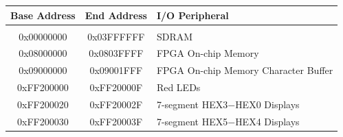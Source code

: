 \documentclass[11pt, twoside, pdftex]{article}
\begin{document}
\begin{table}[h]
    \begin{center}
    \begin{tabular}{c|c|l}
            \textbf{Base Address}
            & \textbf{End Address}
            & \textbf{I/O Peripheral}
				\\\hline\vspace{-3mm}\\
            0x00000000
            & 0x03FFFFFF
            & SDRAM
        \\
            0x08000000
            & 0x0803FFFF
            & FPGA On-chip Memory
        \\
            0x09000000
            & 0x09001FFF
            & FPGA On-chip Memory Character Buffer
        \\
            0xFF200000
            & 0xFF20000F
            & Red LEDs
        \\
            0xFF200020
            & 0xFF20002F
            & 7-segment HEX3$-$HEX0 Displays
        \\
            0xFF200030
            & 0xFF20003F
            & 7-segment HEX5$-$HEX4 Displays


\end{tabular}
\end{center}
\end{table}
\end{document}
